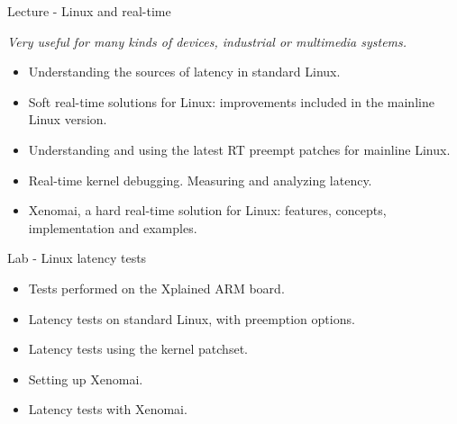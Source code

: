 \documentclass[a4paper,12pt,obeyspaces,spaces,hyphens]{article}
\begin{document}
\feagendaonecolumn
{Lecture - Linux and real-time}
{
  {\em Very useful for many kinds of devices, industrial or multimedia systems.}
  \begin{itemize}
  \item Understanding the sources of latency in standard Linux.
  \item Soft real-time solutions for Linux: improvements included
        in the mainline Linux version.
  \item Understanding and using the latest RT preempt patches for
        mainline Linux.
  \item Real-time kernel debugging. Measuring and analyzing latency.
  \item Xenomai, a hard real-time solution for Linux: features, concepts,
        implementation and examples.
  \end{itemize}
}

\feagendaonecolumn
{Lab - Linux latency tests}
{
  \begin{itemize}
  \item Tests performed on the Xplained ARM board.
  \item Latency tests on standard Linux, with preemption options.
  \item Latency tests using the  kernel patchset.
  \item Setting up Xenomai.
  \item Latency tests with Xenomai.
  \end{itemize}
}
\end{document}
